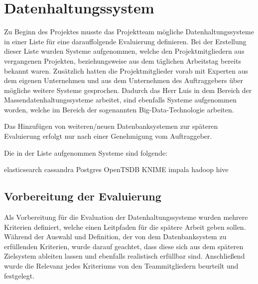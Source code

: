 \section{Datenhaltungssystem}
\label{sec:datenhaltungssystem}
Zu Beginn des Projektes musste das Projektteam mögliche Datenhaltungssysteme in
einer Liste für eine darauffolgende Evaluierung definieren. Bei der Erstellung
dieser Liste wurden Systeme aufgenommen, welche den Projektmitgliedern aus
vergangenen Projekten, beziehungsweise aus dem täglichen Arbeitstag bereits
bekannt waren. Zusätzlich hatten die Projektmitglieder vorab mit Experten aus
dem eigenen Unternehmen und aus dem Unternehmen des Auftraggebers über mögliche
weitere Systeme gesprochen. Dadurch das Herr Luis in dem Bereich der
Massendatenhaltungssysteme arbeitet, sind ebenfalls Systeme aufgenommen worden,
welche im Bereich der sogenannten Big\hyp{}Data\hyp{}Technologie arbeiten.

Das Hinzufügen von weiteren/neuen Datenbanksystemen zur späteren
Evaluierung erfolgt nur nach einer Genehmigung vom Auftraggeber.

Die in der Liste aufgenommen Systeme sind folgende:

\begin{outline}
  \1 elasticsearch
  \1 cassandra
  \1 Postgres
  \1 OpenTSDB
  \1 KNIME
  \1 impala
  \1 hadoop
  \1 hive
\end{outline}
\nl%

\subsection{Vorbereitung der Evaluierung}
\label{subsec:DBS_vorbereitung_der_evaluierung}
Als Vorbereitung für die Evaluation der Datenhaltungssysteme wurden mehrere
Kriterien definiert, welche einen Leitpfaden für die spätere Arbeit geben
sollen. Während der Auswahl und Definition, der von dem Datenbanksystem zu
erfüllenden Kriterien, wurde darauf geachtet, dass diese sich aus dem späteren
Zielsystem ableiten lassen und ebenfalls realistisch erfüllbar sind.
Anschließend wurde die Relevanz jedes Kriteriums von den Teammitgliedern
beurteilt und festgelegt.

